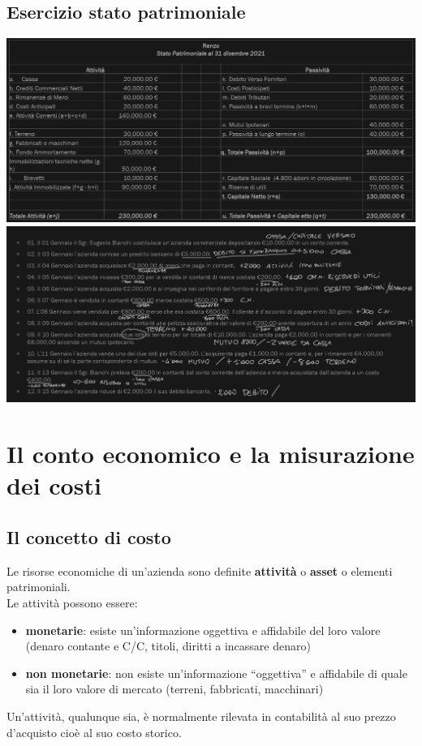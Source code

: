 \documentclass{article}
\begin{document}
\subsection{Esercizio stato patrimoniale}
\begin{center}
    \includegraphics[scale=0.3]{Image/Rendiconto renzo.png}
    \includegraphics[scale=0.2925]{Image/Esercizio stato patrimoniale_1.png}
\end{center}




\section{Il conto economico e la misurazione dei costi}
\subsection{Il concetto di costo}
Le risorse economiche di un'azienda sono definite \textbf{attività} o \textbf{asset} o elementi patrimoniali.
\vspace*{0.2cm}\\
Le attività possono essere:
\begin{itemize}
    \item \textbf{monetarie}: esiste un'informazione oggettiva e affidabile del loro valore (denaro contante e C/C, titoli, diritti a incassare denaro)
    \item \textbf{non monetarie}: non esiste un'informazione “oggettiva” e affidabile di quale sia il loro valore di mercato (terreni, fabbricati, macchinari)
\end{itemize}
Un'attività, qualunque sia, è normalmente rilevata in contabilità al suo prezzo d'acquisto cioè al suo
costo storico.
\end{document}
